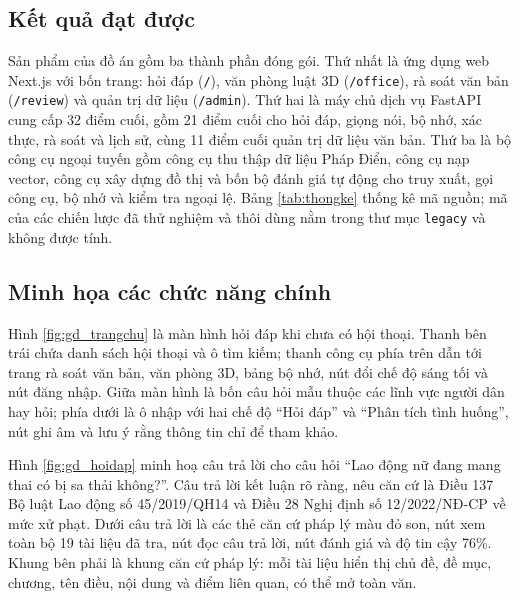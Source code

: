 \documentclass[../DoAn.tex]{subfiles}
\begin{document}
\subsection{Kết quả đạt được}
Sản phẩm của đồ án gồm ba thành phần đóng gói. Thứ nhất là ứng dụng web Next.js với bốn trang: hỏi đáp (\texttt{/}), văn phòng luật 3D (\texttt{/office}), rà soát văn bản (\texttt{/review}) và quản trị dữ liệu (\texttt{/admin}). Thứ hai là máy chủ dịch vụ FastAPI cung cấp 32 điểm cuối, gồm 21 điểm cuối cho hỏi đáp, giọng nói, bộ nhớ, xác thực, rà soát và lịch sử, cùng 11 điểm cuối quản trị dữ liệu văn bản. Thứ ba là bộ công cụ ngoại tuyến gồm công cụ thu thập dữ liệu Pháp Điển, công cụ nạp vector, công cụ xây dựng đồ thị và bốn bộ đánh giá tự động cho truy xuất, gọi công cụ, bộ nhớ và kiểm tra ngoại lệ. Bảng \ref{tab:thongke} thống kê mã nguồn; mã của các chiến lược đã thử nghiệm và thôi dùng nằm trong thư mục \texttt{legacy} và không được tính.



\subsection{Minh họa các chức năng chính}
\label{subsection:4.3.3}
Hình \ref{fig:gd_trangchu} là màn hình hỏi đáp khi chưa có hội thoại. Thanh bên trái chứa danh sách hội thoại và ô tìm kiếm; thanh công cụ phía trên dẫn tới trang rà soát văn bản, văn phòng 3D, bảng bộ nhớ, nút đổi chế độ sáng tối và nút đăng nhập. Giữa màn hình là bốn câu hỏi mẫu thuộc các lĩnh vực người dân hay hỏi; phía dưới là ô nhập với hai chế độ ``Hỏi đáp'' và ``Phân tích tình huống'', nút ghi âm và lưu ý rằng thông tin chỉ để tham khảo.


Hình \ref{fig:gd_hoidap} minh hoạ câu trả lời cho câu hỏi ``Lao động nữ đang mang thai có bị sa thải không?''. Câu trả lời kết luận rõ ràng, nêu căn cứ là Điều 137 Bộ luật Lao động số 45/2019/QH14 và Điều 28 Nghị định số 12/2022/NĐ-CP về mức xử phạt. Dưới câu trả lời là các thẻ căn cứ pháp lý màu đỏ son, nút xem toàn bộ 19 tài liệu đã tra, nút đọc câu trả lời, nút đánh giá và độ tin cậy 76\%. Khung bên phải là khung căn cứ pháp lý: mỗi tài liệu hiển thị chủ đề, đề mục, chương, tên điều, nội dung và điểm liên quan, có thể mở toàn văn.

\end{document}
